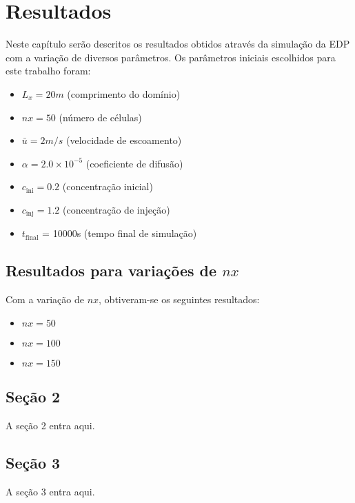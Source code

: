 \chapter{Resultados}
Neste capítulo serão descritos os resultados obtidos através da simulação da
EDP com a variação de diversos parâmetros. Os parâmetros iniciais escolhidos
para este trabalho foram:
\begin{itemize}
    \item $L_x = 20m$ (comprimento do domínio)
    \item $nx = 50$ (número de células)
    \item $\bar{u} = 2m/s$ (velocidade de escoamento)
    \item $\alpha = 2.0\times10^{-5}$ (coeficiente de difusão)
    \item $c_{\text{ini}} = 0.2$ (concentração inicial)
    \item $c_{\text{inj}} = 1.2$ (concentração de injeção)
    \item $t_\text{final}$ = 10000s (tempo final de simulação)
\end{itemize}

\section{Resultados para variações de $nx$}
Com a variação de $nx$, obtiveram-se os seguintes resultados:
\begin{itemize}
    \item $nx = 50$

    \item $nx = 100$

    \item $nx = 150$
\end{itemize}

\section{Seção 2}
A seção 2 entra aqui.

\section{Seção 3}
A seção 3 entra aqui.